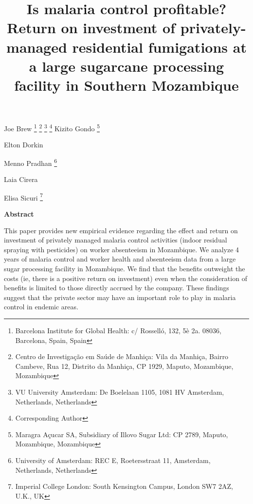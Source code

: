 \documentclass[]{article}
\title{Is malaria control profitable? Return on investment of privately-managed
residential fumigations at a large sugarcane processing facility in
Southern Mozambique}
\author{}
\date{}
\let\rmarkdownfootnote\footnote%
\def\footnote{\protect\rmarkdownfootnote}
\newcommand{\footremember}[2]{%
    \footnote{#2}
    \newcounter{#1}
    \setcounter{#1}{\value{footnote}}%
}
\newcommand{\footrecall}[1]{%
    \footnotemark[\value{#1}]%
}
\begin{document}
\maketitle

\begin{center}
\begin{large}

Joe Brew\footremember{isglobal}{Barcelona Institute for Global Health: c/ Rosselló, 132, 5è 2a. 08036, Barcelona, Spain, Spain}\footremember{cism}{Centro de Investigação em Saúde de Manhiça: Vila da Manhiça, Bairro Cambeve, Rua 12, Distrito da Manhiça, CP 1929, Maputo, Mozambique, Mozambique}\footremember{vu}{VU University Amsterdam: De Boelelaan 1105, 1081 HV Amsterdam, Netherlands, Netherlands} \footnote{Corresponding Author}
Kizito Gondo\footremember{ma}{Maragra Açucar SA, Subsidiary of Illovo Sugar Ltd: CP 2789, Maputo, Mozambique, Mozambique}
Elton Dorkin\footrecall{ma}
Menno Pradhan\footrecall{vu}\footremember{uva}{University of Amsterdam: REC E, Roetersstraat 11, Amsterdam, Netherlands, Netherlands}
Laia Cirera\footrecall{isglobal}\footrecall{cism}
Elisa Sicuri\footrecall{isglobal}\footrecall{cism}\footremember{icl}{Imperial College London: South Kensington Campus, London SW7 2AZ, U.K., UK}

\end{large}
\end{center}

\vspace{5mm}

\begin{center}
\textbf{Abstract}  
\end{center}

\vspace{5mm}

\begin{center}
\begin{changemargin}{3cm}{3cm} 

This paper provides new empirical evidence regarding the effect and return on investment of privately managed malaria control activities (indoor residual spraying with pesticides) on worker absenteeism in Mozambique. We analyze 4 years of malaria control and worker health and absenteeism data from a large sugar processing facility in Mozambique. We find that the benefits outweight the costs (ie, there is a positive return on investment) even when the consideration of benefits is limited to those directly accrued by the company. These findings suggest that the private sector may have an important role to play in malaria control in endemic areas.

\end{changemargin}
\end{center}
\end{document}
